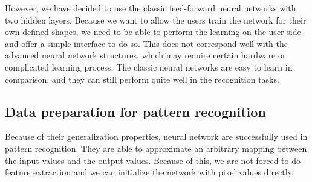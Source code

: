 However,  we have decided to use the classic feed-forward neural networks with two hidden layers. Because we want to allow the users train the network for their own defined shapes, we need to be able to perform the learning on the user side and offer a simple interface to do so. 
This does not correspond well with the advanced neural network structures, which may require certain  hardware or complicated learning process. The classic neural networks are easy to learn in comparison, and they can still perform quite well in the recognition tasks.

\subsection{Data preparation for pattern recognition}
\cite{bishop}  Because of their generalization properties, neural network are successfully used in pattern recognition. They are able to approximate an arbitrary mapping between the input values and the output values. Because of this, we are not forced to do feature extraction and we can initialize the network with pixel values directly. 


